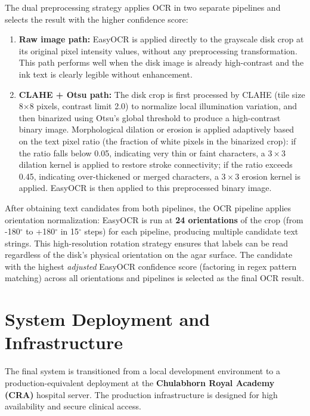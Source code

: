 The dual preprocessing strategy applies OCR in two separate pipelines and selects the result
with the higher confidence score:
\begin{enumerate}
  \item \textbf{Raw image path:} EasyOCR \cite{jaidedai2024easyocr} is applied directly to
        the grayscale disk crop at its original pixel intensity values, without any
        preprocessing transformation.
        This path performs well when the disk image is already high-contrast and the ink
        text is clearly legible without enhancement.
  \item \textbf{CLAHE + Otsu path:} The disk crop is first processed by CLAHE (tile size
        8$\times$8 pixels, contrast limit 2.0) to normalize local illumination variation,
        and then binarized using Otsu's global threshold to produce a high-contrast binary
        image. Morphological dilation or erosion is applied adaptively based on the text
        pixel ratio (the fraction of white pixels in the binarized crop): if the ratio
        falls below 0.05, indicating very thin or faint characters, a $3\times3$ dilation
        kernel is applied to restore stroke connectivity; if the ratio exceeds 0.45,
        indicating over-thickened or merged characters, a $3\times3$ erosion kernel is applied.
        EasyOCR is then applied to this preprocessed binary image.
\end{enumerate}

After obtaining text candidates from both pipelines, the OCR pipeline applies orientation
normalization: EasyOCR is run at \textbf{24 orientations} of the crop (from -180$^\circ$ to +180$^\circ$ in 15$^\circ$ steps) for each pipeline, producing multiple candidate text strings.
This high-resolution rotation strategy ensures that labels can be read regardless of the disk's physical orientation on the agar surface. The candidate with the highest \emph{adjusted} EasyOCR confidence score (factoring in regex pattern matching) across all orientations and pipelines is selected as the final OCR result.

\section{System Deployment and Infrastructure}

The final system is transitioned from a local development environment to a production-equivalent deployment at the \textbf{Chulabhorn Royal Academy (CRA)} hospital server. The production infrastructure is designed for high availability and secure clinical access.

